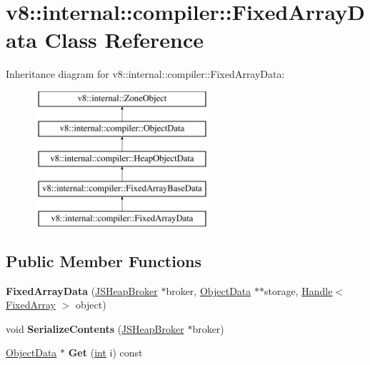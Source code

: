 \hypertarget{classv8_1_1internal_1_1compiler_1_1FixedArrayData}{}\section{v8\+:\+:internal\+:\+:compiler\+:\+:Fixed\+Array\+Data Class Reference}
\label{classv8_1_1internal_1_1compiler_1_1FixedArrayData}
Inheritance diagram for v8\+:\+:internal\+:\+:compiler\+:\+:Fixed\+Array\+Data\+:\begin{figure}[H]
\begin{center}
\leavevmode
\includegraphics[height=5.000000cm]{classv8_1_1internal_1_1compiler_1_1FixedArrayData}
\end{center}
\end{figure}
\subsection*{Public Member Functions}
\begin{DoxyCompactItemize}
\item 
\mbox{\label{classv8_1_1internal_1_1compiler_1_1FixedArrayData_ad447ae11643872143e87dde4f1954bc3}} 
{\bfseries Fixed\+Array\+Data} (\mbox{\hyperlink{classv8_1_1internal_1_1compiler_1_1JSHeapBroker}{J\+S\+Heap\+Broker}} $\ast$broker, \mbox{\hyperlink{classv8_1_1internal_1_1compiler_1_1ObjectData}{Object\+Data}} $\ast$$\ast$storage, \mbox{\hyperlink{classv8_1_1internal_1_1Handle}{Handle}}$<$ \mbox{\hyperlink{classv8_1_1internal_1_1FixedArray}{Fixed\+Array}} $>$ object)
\item 
\mbox{\label{classv8_1_1internal_1_1compiler_1_1FixedArrayData_a6fdb1b98e926efe3a9e71c2379b2eeed}} 
void {\bfseries Serialize\+Contents} (\mbox{\hyperlink{classv8_1_1internal_1_1compiler_1_1JSHeapBroker}{J\+S\+Heap\+Broker}} $\ast$broker)
\item 
\mbox{\label{classv8_1_1internal_1_1compiler_1_1FixedArrayData_a153128dad95e8ef4f46cc3a71f87d1bb}} 
\mbox{\hyperlink{classv8_1_1internal_1_1compiler_1_1ObjectData}{Object\+Data}} $\ast$ {\bfseries Get} (\mbox{\hyperlink{classint}{int}} i) const
\end{DoxyCompactItemize}
